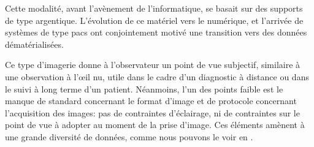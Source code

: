 Cette modalité, avant l’avènement de l’informatique, se basait sur des supports de type argentique. L’évolution de ce matériel vers le numérique, et l’arrivée de systèmes de type \gls{pacs} ont conjointement motivé une transition vers des données dématérialisées.\par

Ce type d’imagerie donne à l’observateur un point de vue subjectif, similaire à une observation à l’œil nu, utile dans le cadre d’un diagnostic à distance ou dans le suivi à long terme d’un patient. Néanmoins, l'un des points faible est le manque de standard concernant le format d'image et de protocole concernant l'acquisition des images: pas de contraintes d'éclairage, ni de contraintes sur le point de vue à adopter au moment de la prise d'image. Ces éléments amènent à une grande diversité de données, comme nous pouvons le voir en .\par

